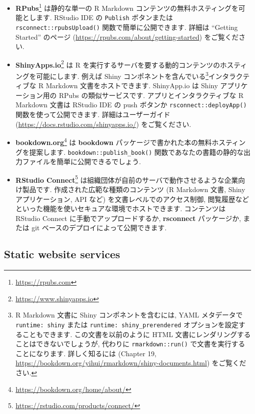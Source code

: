 \documentclass[
  11pt,
  lualatex,
  ja=standard]{bxjsreport}
\renewcommand{\href}[2]{#2\footnote{\url{#1}}}
\begin{document}
\begin{itemize}
\item
  \href{https://rpubs.com}{\textbf{RPubs}} は静的な単一の R Markdown コンテンツの無料ホスティングを可能とします. RStudio IDE の \texttt{Publish} ボタンまたは \texttt{rsconnect::rpubsUpload()} 関数で簡単に公開できます. 詳細は ``Getting Started'' のページ (\url{https://rpubs.com/about/getting-started}) をご覧ください.
\item
  \href{https://www.shinyapps.io}{\textbf{ShinyApps.io}} は R を実行するサーバを要する動的コンテンツのホスティングを可能にします. 例えば Shiny コンポネントを含んでいる\footnote{R Markdown 文書に Shiny コンポネントを含むには, YAML メタデータで \texttt{runtime: shiny} または \texttt{runtime: shiny\_prerendered} オプションを設定することもできます. この文書を以前のように HTML 文書にレンダリングすることはできないでしょうが, 代わりに \texttt{rmarkdown::run()} で文書を実行することになります. 詳しく知るには \textcite{rmarkdown2018} (Chapter 19, \url{https://bookdown.org/yihui/rmarkdown/shiny-documents.html}) をご覧ください.}インタラクティブな R Markdown 文書をホストできます. ShinyApp.io は Shiny アプリケーション用の RPubs の類似サービスです. アプリとインタラクティブな R Markdown 文書は RStudio IDE の push ボタンか \texttt{rsconnect::deployApp()} 関数を使って公開できます. 詳細はユーザーガイド (\url{https://docs.rstudio.com/shinyapps.io/}) をご覧ください.
\item
  \href{https://bookdown.org/home/about/}{\textbf{bookdown.org}} は \textbf{bookdown} パッケージで書かれた本の無料ホスティングを提案します. \texttt{bookdown::publish\_book()} 関数であなたの書籍の静的な出力ファイルを簡単に公開できるでしょう.
\item
  \href{https://rstudio.com/products/connect/}{\textbf{RStudio Connect}} は組織団体が自前のサーバで動作させるような企業向け製品です. 作成された広範な種類のコンテンツ (R Markdown 文書, Shiny アプリケーション, API など) を文書レベルでのアクセス制御, 閲覧履歴などといった機能を使いセキュアな環境でホストできます. コンテンツは RStudio Connect に手動でアップロードするか, \textbf{rsconnect} パッケージか, または git ベースのデプロイによって公開できます.
\end{itemize}

\hypertarget{static-website-services}{%
\subsection{Static website services}\label{static-website-services}}
\end{document}
